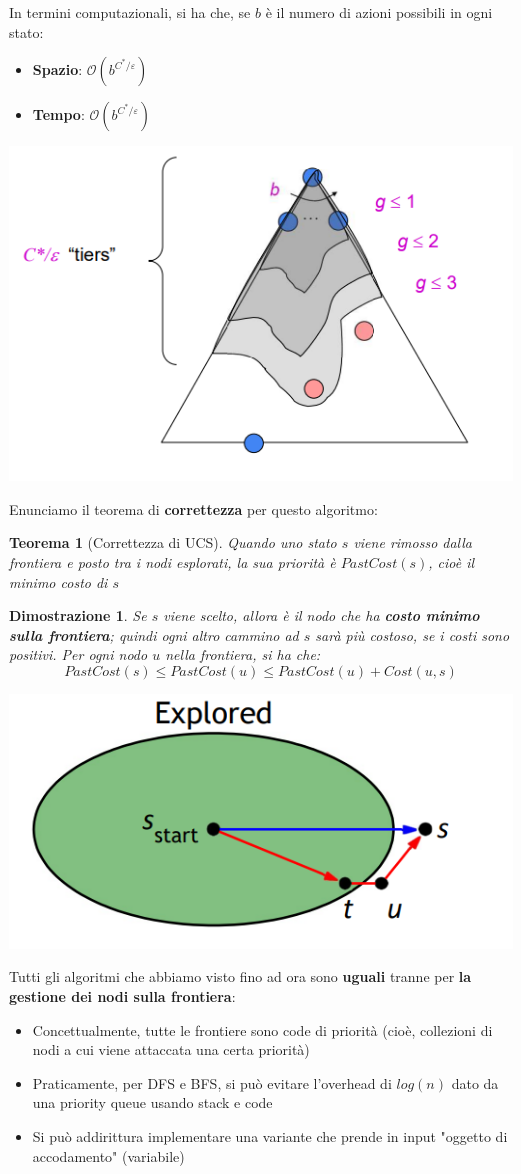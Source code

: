 \documentclass[12pt]{article}
\newtheorem{Teorema}{Teorema}[subsection]
\newtheorem{Dimostrazione}{Dimostrazione}[subsection]
\begin{document}
In termini computazionali, si ha che, se $b$ è il numero di azioni possibili in ogni stato:
\begin{itemize}
    \item \textbf{Spazio}: $\mathcal{O}(b^{C^*/\varepsilon})$
    \item \textbf{Tempo}: $\mathcal{O}(b^{C^*/\varepsilon})$
\end{itemize}
\begin{center}
    \includegraphics[width = 0.55\linewidth]{Images/40.PNG}
\end{center}
Enunciamo il teorema di \textbf{correttezza} per questo algoritmo:
\begin{Teorema}[Correttezza di UCS]
    Quando uno stato $s$ viene rimosso dalla frontiera e posto tra i nodi esplorati, la sua priorità è $PastCost(s)$, cioè il minimo costo di $s$
\end{Teorema}
\begin{Dimostrazione}
    Se $s$ viene scelto, allora è il nodo che ha \textbf{costo minimo sulla frontiera}; quindi ogni altro cammino ad $s$ sarà più costoso, se i costi sono positivi.
    Per ogni nodo $u$ nella frontiera, si ha che:
    $$PastCost(s) \leq PastCost(u) \leq PastCost(u) + Cost(u,s)$$
    \begin{center}
        \includegraphics[width = 0.55\linewidth]{Images/41.PNG}
    \end{center}
\end{Dimostrazione}
Tutti gli algoritmi che abbiamo visto fino ad ora sono \textbf{uguali} tranne per \textbf{la gestione dei nodi sulla frontiera}:
\begin{itemize}
    \item Concettualmente, tutte le frontiere sono code di priorità (cioè, collezioni di nodi a cui viene attaccata una certa priorità)
    \item Praticamente, per DFS e BFS, si può evitare l'overhead di $log(n)$ dato da una priority queue usando stack e code
    \item Si può addirittura implementare una variante che prende in input "oggetto di accodamento" (variabile)
\end{itemize}
\end{document}
